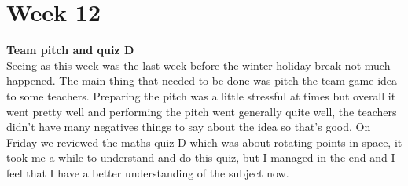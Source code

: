 \documentclass[11pt]{article}
\begin{document}
{\section*{Week 12}
{\small \textbf{Team pitch and quiz D}}\\
Seeing as this week was the last week before the winter holiday break not much happened. The main thing that needed to be done was pitch the team game idea to some teachers. Preparing the pitch was a little stressful at times but overall it went pretty well and performing the pitch went generally quite well, the teachers didn't have many negatives things to say about the idea so that's good. On Friday we reviewed the maths quiz D which was about rotating points in space, it took me a while to understand and do this quiz, but I managed in the end and I feel that I have a better understanding of the subject now.
}
\end{document}
